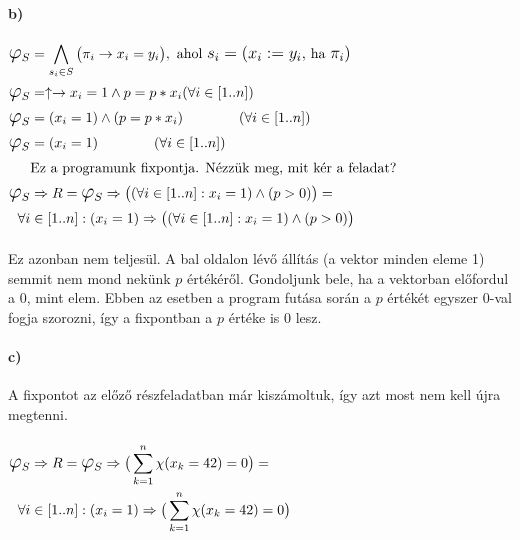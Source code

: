 \documentclass[12pt]{article}
\newcommand{\fixpont}{\ensuremath{\mathlarger{\mathlarger{\varphi}}_S}}
\begin{document}
	\paragraph{b)}
	\paragraph{}
	$
	\begin{aligned}
	\fixpont &=\bigwedge_{s_i  \in S} \big( \pi_i \rightarrow x_i = y_i \big), \text{ ahol } \mathlarger{s_i = (x_i := y_i, }\text{ ha }\mathlarger{ \pi_i)} \\
	\fixpont &= \uparrow \rightarrow x_i = 1 \land p = p*x_i (\forall i \in [1..n]) \\
	\fixpont &= (x_i = 1) \land (p=p*x_i)\qquad \qquad (\forall i \in [1..n])\\
	\fixpont &= (x_i = 1)\qquad \qquad (\forall i \in [1..n])\\
	&\text{Ez a programunk fixpontja. Nézzük meg, mit kér a feladat?}\\
	\fixpont &\Rightarrow R = \fixpont \Rightarrow \big( (\forall i \in [1..n]: x_i = 1) \land (p>0)\big) = \\
	\forall i &\in [1..n]: (x_i = 1) \Rightarrow \big( (\forall i \in [1..n]: x_i = 1) \land (p>0)\big)
	\end{aligned}
	$
	\paragraph{}
	Ez azonban nem teljesül. A bal oldalon lévő állítás (a vektor minden eleme 1) semmit nem mond nekünk $p$ értékéről. Gondoljunk bele, ha a vektorban előfordul a $0$, mint elem. Ebben az esetben a program futása során a $p$ értékét egyszer $0$-val fogja szorozni, így a fixpontban a $p$ értéke is 0 lesz.
	
	\paragraph{c)} A fixpontot az előző részfeladatban már kiszámoltuk, így azt most nem kell újra megtenni.
	\paragraph{}
	$
	\begin{aligned}	
	\fixpont &\Rightarrow R = \fixpont \Rightarrow \big(\sum\limits_{k=1}^{n}\chi(x_k=42) = 0\big) = \\
	\forall i &\in [1..n]: (x_i = 1) \Rightarrow \big(\sum\limits_{k=1}^{n}\chi(x_k=42) = 0\big)\\
	\end{aligned}
	$
\end{document}
